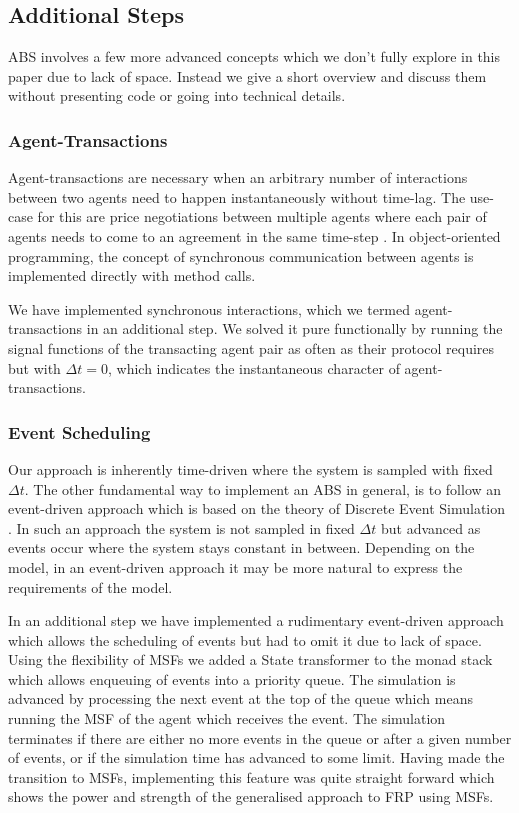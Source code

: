 







\subsection{Additional Steps}
ABS involves a few more advanced concepts which we don't fully explore in this paper due to lack of space. Instead we give a short overview and discuss them without presenting code or going into technical details.

\subsubsection{Agent-Transactions}
Agent-transactions are necessary when an arbitrary number of interactions between two agents need to happen instantaneously without time-lag. The use-case for this are price negotiations between multiple agents where each pair of agents needs to come to an agreement in the same time-step \cite{epstein_growing_1996}. In object-oriented programming, the concept of synchronous communication between agents is implemented directly with method calls.

We have implemented synchronous interactions, which we termed agent-transactions in an additional step. We solved it pure functionally by running the signal functions of the transacting agent pair as often as their protocol requires but with $\Delta t=0$, which indicates the instantaneous character of agent-transactions.

\subsubsection{Event Scheduling}
Our approach is inherently time-driven where the system is sampled with fixed $\Delta t$. The other fundamental way to implement an ABS in general, is to follow an event-driven approach \cite{meyer_event-driven_2014} which is based on the theory of Discrete Event Simulation \cite{zeigler_theory_2000}. In such an approach the system is not sampled in fixed $\Delta t$ but advanced as events occur where the system stays constant in between. Depending on the model, in an event-driven approach it may be more natural to express the requirements of the model.

In an additional step we have implemented a rudimentary event-driven approach which allows the scheduling of events but had to omit it due to lack of space. Using the flexibility of MSFs we added a State transformer to the monad stack which allows enqueuing of events into a priority queue. The simulation is advanced by processing the next event at the top of the queue which means running the MSF of the agent which receives the event. The simulation terminates if there are either no more events in the queue or after a given number of events, or if the simulation time has advanced to some limit. Having made the transition to MSFs, implementing this feature was quite straight forward which shows the power and strength of the generalised approach to FRP using MSFs.

